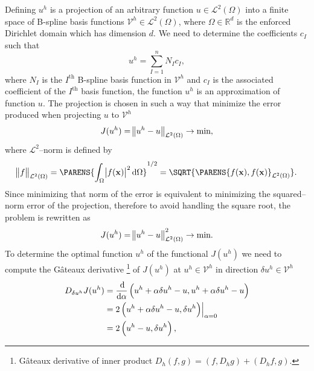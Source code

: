 Defining $u ^ h$ is a projection of an arbitrary function $u \in \mathcal{L} ^ 2(\Omega)$ into a finite space of B-spline basis functions  $\mathcal{V} ^ h \in \mathcal{L} ^ 2(\Omega)$, where $\Omega \in \mathbb{R} ^ d$ is the enforced Dirichlet domain which has dimension $d$. We need to determine the coefficients $c_I$ such that
\begin{equation}
    u ^ h = \sum_{I = 1} ^ n N_I c_I,
\end{equation}
where $N_I$ is the $I^\text{th}$ B-spline basis function in $\mathcal{V} ^ h$ and $c_I$ is the associated coefficient of the $I^\text{th}$ basis function, the function $u^h$ is an approximation of function $u$. The projection is chosen in such a way that minimize the error produced when projecting $u$ to $\mathcal{V} ^ h$
\begin{equation}
    J(u ^ h) = \enVert[1]{u ^ h - u}_{\mathcal{L}^2 (\Omega)} \rightarrow \text{min},
\end{equation}
where $\mathcal{L}^2$--norm is defined by
\begin{equation}
    \enVert[1]{f}_{\mathcal{L}^2 (\Omega)} = \PARENS{\int_{\Omega} \abs[1]{f(\mathbf{x})} ^ 2 \dif \Omega} ^ {1/2}
	= \SQRT{\PARENS{f(\mathbf{x}), f(\mathbf{x})}_{\mathcal{L}^2 (\Omega)}}.
\end{equation}
Since minimizing that norm of the error is equivalent to minimizing the squared--norm error of the projection, therefore to avoid handling the square root, the problem is rewritten as
\begin{equation}
    J(u ^ h) = \enVert[1]{u ^ h - u}_{\mathcal{L}^2 (\Omega)} ^ 2 \rightarrow \text{min}.
    \label{eq:Ch3OptPro}
\end{equation}
To determine the optimal function $u ^ h$ of the functional $J(u ^ h)$ we need to compute the G\^ateaux derivative \footnote{G\^ateaux derivative of inner product $D_h(f, g) = (f, D_h g) + (D_h f, g)$.} of $J(u ^ h)$ at $u ^ h \in \mathcal{V} ^ h$ in direction $\delta u ^ h \in \mathcal{V} ^ h $
\begin{equation}
    \begin{aligned}
    	D_{\delta u ^ h} J(u ^ h) &= \dfrac{\dif }{\dif \alpha} \left(%
        u ^ h + \alpha \delta u ^ h - u, u ^ h + \alpha \delta u ^ h - u
        \right)\\%
        &= \eval[2]{2 \left(u ^ h + \alpha \delta u ^ h - u, \delta u ^ h \right)}_{\alpha = 0}\\%
        & = 2 \left(u ^ h - u, \delta u ^ h\right),
    \end{aligned}
\end{equation}
